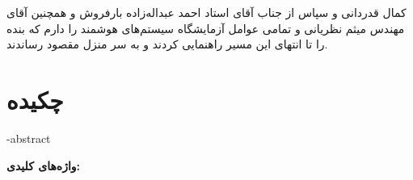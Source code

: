 \newpage\thispagestyle{empty}
{\nastaliq
کمال قدردانی و سپاس از جناب آقای استاد احمد عبداله‌زاده بارفروش و همچنین آقای مهندس میثم نظریانی و تمامی عوامل آزمایشگاه سیستم‌های هوشمند را دارم که بنده را تا انتهای این مسیر راهنمایی کردند و به سر منزل مقصود رساندند.
}























\newpage\clearpage

\pagestyle{style2}

\vspace*{-1cm}
\section*{\centering چکیده}
\vspace*{.5cm}
\ffa-abstract
\vspace*{2cm}


{\noindent\large\textbf{واژه‌های کلیدی:}}\par
\vspace*{.5cm}
\fkeywords